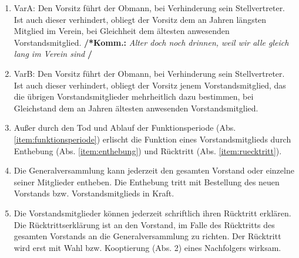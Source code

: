 \documentclass[a4paper,12pt]{article}
\newcommand{\comment}[1]{{\bf /*Komm.:} \textit{#1} {\bf */}}
\begin{document}
\begin{enumerate}
\comment{Entscheidungsfindung : Dieser (und letzter) Punkt: wie werden also day-to-day Entscheidungen getroffen }
\item VarA: Den Vorsitz führt der Obmann, bei Verhinderung sein Stellvertreter. Ist auch dieser verhindert, obliegt der Vorsitz dem an Jahren längsten Mitglied im Verein, bei Gleichheit dem ältesten anwesenden Vorstandsmitglied. \comment{Alter doch noch drinnen, weil wir alle gleich lang im Verein sind}
\item VarB: Den Vorsitz führt der Obmann, bei Verhinderung sein Stellvertreter. Ist auch dieser verhindert, obliegt der Vorsitz  jenem Vorstandsmitglied, das die übrigen Vorstandsmitglieder mehrheitlich dazu bestimmen, bei Gleichstand dem an Jahren ältesten anwesenden Vorstandsmitglied.
\item Außer durch den Tod und Ablauf der Funktionsperiode (Abs. \ref{item:funktionsperiode}) erlischt die Funktion eines Vorstandsmitglieds durch Enthebung (Abs. \ref{item:enthebung}) und Rücktritt (Abs. \ref{item:ruecktritt}).
\item \label{item:enthebung} Die Generalversammlung kann jederzeit den gesamten Vorstand oder einzelne seiner Mitglieder entheben. Die Enthebung tritt mit Bestellung des neuen Vorstands bzw. Vorstandsmitglieds in Kraft.
\item \label{item:ruecktritt} Die Vorstandsmitglieder können jederzeit schriftlich ihren Rücktritt erklären. Die Rücktrittserklärung ist an den Vorstand, im Falle des Rücktritts des gesamten Vorstands an die Generalversammlung zu richten. Der Rücktritt wird erst mit Wahl bzw. Kooptierung (Abs. 2) eines Nachfolgers wirksam.
\end{enumerate}
\end{document}
